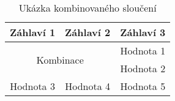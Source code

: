 \begin{table}[h!]
    \centering
    \begin{tabular}{|c|c|c|}
        \hline
        \textbf{Záhlaví 1} & \textbf{Záhlaví 2} & \textbf{Záhlaví 3} \\
        \hline
        \multicolumn{2}{|c|}{\multirow{2}{*}{Kombinace}} & Hodnota 1 \\
        \cline{3-3}
        \multicolumn{2}{|c|}{} & Hodnota 2 \\
        \hline
        Hodnota 3 & Hodnota 4 & Hodnota 5 \\
        \hline
    \end{tabular}
    \caption{Ukázka kombinovaného sloučení}
    \label{tab:combined_merge}
\end{table}
